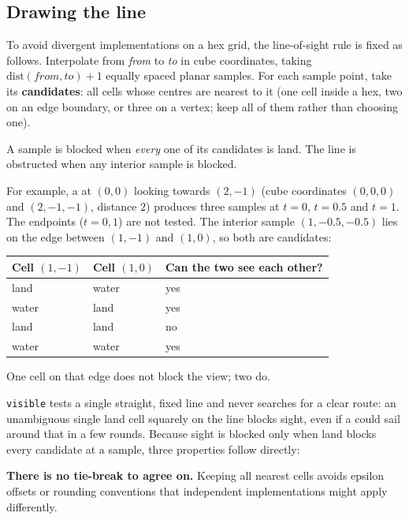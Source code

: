 \documentclass{article}
\begin{document}
\subsection{Drawing the line}
\label{proto:losdecide}

To avoid divergent implementations on a hex grid, the line-of-sight rule is fixed as follows.
Interpolate from \emph{from} to \emph{to} in cube coordinates, taking
$\mathrm{dist}(\mathit{from},\mathit{to}) + 1$ equally spaced planar samples. For each sample
point, take its \textbf{candidates}: all cells whose centres are nearest to it (one cell inside a
hex, two on an edge boundary, or three on a vertex; keep all of them rather than choosing one).

\begin{center}
A sample is blocked when \emph{every} one of its candidates is land. The line is obstructed when
any interior sample is blocked.
\end{center}

For example, a \ship{} at $(0,0)$ looking towards $(2,-1)$ (cube coordinates $(0,0,0)$ and
$(2,-1,-1)$, distance $2$) produces three samples at $t = 0$, $t = 0.5$ and $t = 1$. The
endpoints ($t = 0, 1$) are not tested. The interior sample $(1, -0.5, -0.5)$ lies on the edge
between $(1,-1)$ and $(1,0)$, so both are candidates:

\begin{center}
\begin{tabular}{|l|l|l|}
 \hline
 {\bf Cell $(1,-1)$} & {\bf Cell $(1,0)$} & {\bf Can the two \ships{} see each other?} \\
 \hline\hline
 land & water & yes \\
 \hline
 water & land & yes \\
 \hline
 land & land & no \\
 \hline
 water & water & yes \\
 \hline
\end{tabular}
\end{center}

One \island{} cell on that edge does not block the view; two do.

\texttt{visible} tests a single straight, fixed line and never searches for a clear route: an
unambiguous single land cell squarely on the line blocks sight, even if a \ship{} could sail around
that \island{} in a few rounds. Because sight is blocked only when land blocks every candidate at a
sample, three properties follow directly:

\textbf{There is no tie-break to agree on.} Keeping all nearest cells avoids epsilon offsets or
rounding conventions that independent implementations might apply differently.
\end{document}

